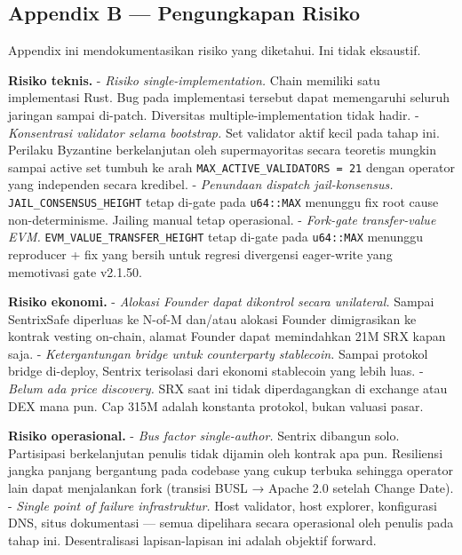 \documentclass[11pt,a4paper]{article}
\begin{document}
\hypertarget{appendix-b-pengungkapan-risiko}{%
\subsection{Appendix B --- Pengungkapan Risiko}\label{appendix-b-pengungkapan-risiko}}

Appendix ini mendokumentasikan risiko yang diketahui. Ini tidak eksaustif.

\textbf{Risiko teknis.}
- \emph{Risiko single-implementation.} Chain memiliki satu implementasi Rust. Bug pada implementasi tersebut dapat memengaruhi seluruh jaringan sampai di-patch. Diversitas multiple-implementation tidak hadir.
- \emph{Konsentrasi validator selama bootstrap.} Set validator aktif kecil pada tahap ini. Perilaku Byzantine berkelanjutan oleh supermayoritas secara teoretis mungkin sampai active set tumbuh ke arah \texttt{MAX\_ACTIVE\_VALIDATORS\ =\ 21} dengan operator yang independen secara kredibel.
- \emph{Penundaan dispatch jail-konsensus.} \texttt{JAIL\_CONSENSUS\_HEIGHT} tetap di-gate pada \texttt{u64::MAX} menunggu fix root cause non-determinisme. Jailing manual tetap operasional.
- \emph{Fork-gate transfer-value EVM.} \texttt{EVM\_VALUE\_TRANSFER\_HEIGHT} tetap di-gate pada \texttt{u64::MAX} menunggu reproducer + fix yang bersih untuk regresi divergensi eager-write yang memotivasi gate v2.1.50.

\textbf{Risiko ekonomi.}
- \emph{Alokasi Founder dapat dikontrol secara unilateral.} Sampai SentrixSafe diperluas ke N-of-M dan/atau alokasi Founder dimigrasikan ke kontrak vesting on-chain, alamat Founder dapat memindahkan 21M SRX kapan saja.
- \emph{Ketergantungan bridge untuk counterparty stablecoin.} Sampai protokol bridge di-deploy, Sentrix terisolasi dari ekonomi stablecoin yang lebih luas.
- \emph{Belum ada price discovery.} SRX saat ini tidak diperdagangkan di exchange atau DEX mana pun. Cap 315M adalah konstanta protokol, bukan valuasi pasar.

\textbf{Risiko operasional.}
- \emph{Bus factor single-author.} Sentrix dibangun solo. Partisipasi berkelanjutan penulis tidak dijamin oleh kontrak apa pun. Resiliensi jangka panjang bergantung pada codebase yang cukup terbuka sehingga operator lain dapat menjalankan fork (transisi BUSL → Apache 2.0 setelah Change Date).
- \emph{Single point of failure infrastruktur.} Host validator, host explorer, konfigurasi DNS, situs dokumentasi --- semua dipelihara secara operasional oleh penulis pada tahap ini. Desentralisasi lapisan-lapisan ini adalah objektif forward.
\end{document}
